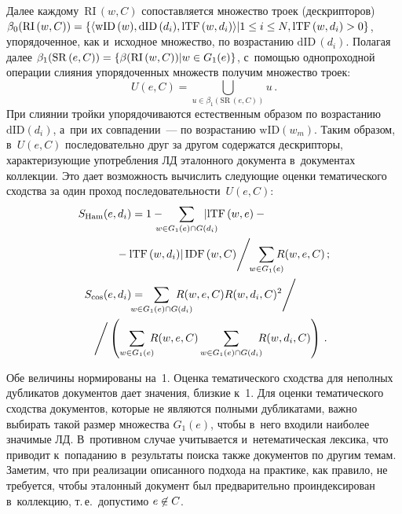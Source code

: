\begin{multicols}{2}
 Далее каждому~$\mathrm{RI}\,(w,C)$ сопоставляется 
множество троек (дескрипторов) $\beta_0(\mathrm{RI}\,(w,C))\hm= \{\langle 
\mathrm{wID}\,(w), \mathrm{dID}\,(d_i), \mathrm{lTF}\,(w,d_i)\rangle \vert 
1\hm\leq i\hm\leq N,\linebreak \mathrm{lTF}\,(w,d_i)\hm>0\}$, 
упорядоченное, как и~исходное множество, по возрастанию $\mathrm{dID}\,(d_i)$. Полагая 
далее $\beta_1(\mathrm{SR}\,(e,C))\hm= \{\beta(\mathrm{RI}\,(w,C))\vert w\hm\in 
G_1(e)\}$,  
с~по\-мощью однопроходной операции слияния упорядоченных множеств 
получим множество троек:
$$
U(e,C)= \mathop{\bigcup}\limits_{u\in \beta_1(\mathrm{SR}\,(e,C))} u\,.
$$ 
При слиянии тройки упорядочиваются естественным образом по воз\-рас\-та\-нию 
$\mathrm{dID}\left(d_i\right)$, а~при их совпадении~--- по воз\-рас\-та\-нию 
$\mathrm{wID}\left(w_m\right)$. Таким 
образом, в~$U(e,C)$ последовательно друг за другом содержатся дескрипторы, 
характеризующие употребления ЛД эталонного документа в~документах 
коллекции. Это дает возможность вычислить следующие оценки тематического 
сходства за один проход последовательности~$U(e,C)$:
\begin{align*}
S_{\mathrm{Ham}}(e,d_i)&=1-\hspace*{-3mm}\sum\limits_{w\in G_1(e)\cap G(d_i)}\hspace*{-5mm}
\left\vert \mathrm{lTF}\,(w,e)-{}\right.\\
&\left.\hspace*{-6mm}{}-
\mathrm{lTF}\,(w,d_i)\right\vert \mathrm{IDF}\,(w,C)\Bigg/\hspace*{-1mm}
\sum\limits_{w\in G_1(e)}\hspace*{-3mm} R(w,e,C)\,;
\\
S_{\mathrm{cos}}(e,d_i) &=\hspace*{-5mm}\sum\limits_{w\in G_1(e)\cap G(d_i)}\hspace*{-6mm}
 R(w,e,C) R(w,d_i, 
C)^2\Bigg/ \\
&\hspace*{-34pt}\Bigg/
\left(\sum\limits_{w\in G_1(e)} \hspace*{-2mm}R(w,e,C) \sum\limits_{w\in G_1(e)\cap 
G(d_i)}\hspace*{-2mm} R(w,d_i,C)\right)\,.
\end{align*}
  
  Обе величины нормированы на~1. Оценка тематического сходства для 
неполных дубликатов документов дает значения, близкие к~1. Для оценки 
тематического сходства документов, которые не являются полными 
дубликатами, важно выбирать такой размер множества $G_1(e)$, чтобы в~него 
входили наиболее значимые ЛД. В~противном случае учитывается 
и~нетематическая лексика, что приводит к~попаданию в~результаты поиска 
также документов по другим темам. Заметим, что при реализации описанного 
подхода на практике, как правило, не требуется, чтобы эталонный документ 
был предварительно проиндексирован в~коллекцию, т.\,е.\ до\-пус\-ти\-мо 
$e\hm\not\in C$.


\end{multicols}
